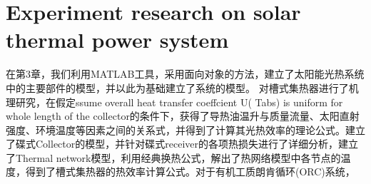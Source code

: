 \chapter{Experiment research on solar thermal power system}

在第3章，我们利用MATLAB工具，采用面向对象的方法，建立了太阳能光热系统中的主要部件的模型，并以此为基础建立了系统的模型。
对槽式集热器进行了机理研究，在假定ssume overall heat transfer coeffcient U( Tabs) is uniform for whole length of the collector的条件下，获得了导热油温升与质量流量、太阳直射强度、环境温度等因素之间的关系式，并得到了计算其光热效率的理论公式。建立了碟式Collector的模型，并针对碟式receiver的各项热损失进行了详细分析，建立了Thermal network模型，利用经典换热公式，解出了热网络模型中各节点的温度，得到了槽式集热器的热效率计算公式。对于有机工质朗肯循环(ORC)系统，


